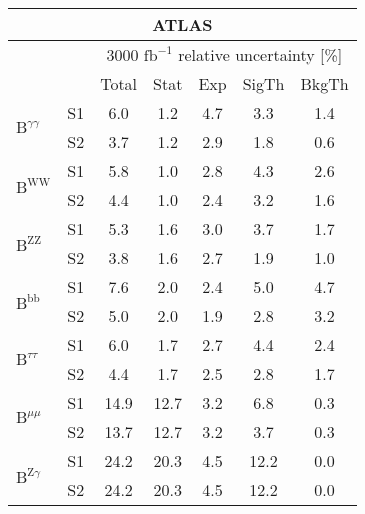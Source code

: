 \begin{tabular}{@{} l c c@{\hskip 0.15in} c c c c @{}}
  \hline
     \multicolumn{7}{c}{ATLAS}\\
 \hline
  &  & \multicolumn{5}{c}{3000 $\text{fb}^{-1}$ relative uncertainty [\%]} \\
  &  & Total & Stat & Exp & SigTh & BkgTh \\
  \hline
  \multirow{2}{*}{$\mathrm{B}^{\gamma\gamma}$} & S1 &6.0   & 1.2   & 4.7   & 3.3   & 1.4  \\[1pt] 
  & S2 &3.7   & 1.2   & 2.9   & 1.8   & 0.6  \\[4pt]
  \multirow{2}{*}{$\mathrm{B}^{\mathrm{WW}}$} & S1 &5.8   & 1.0   & 2.8   & 4.3   & 2.6  \\[1pt]
  & S2 &4.4   & 1.0   & 2.4   & 3.2   & 1.6  \\[4pt]
  \multirow{2}{*}{$\mathrm{B}^{\mathrm{ZZ}}$} & S1 &5.3   & 1.6   & 3.0   & 3.7   & 1.7  \\[1pt]
  & S2 &3.8   & 1.6   & 2.7   & 1.9   & 1.0  \\[4pt]
  \multirow{2}{*}{$\mathrm{B}^{\mathrm{bb}}$} & S1 &7.6   & 2.0   & 2.4   & 5.0   & 4.7  \\[1pt]
  & S2 &5.0   & 2.0   & 1.9   & 2.8   & 3.2  \\[4pt]
  \multirow{2}{*}{$\mathrm{B}^{\tau\tau }$} & S1 &6.0   & 1.7   & 2.7   & 4.4   & 2.4  \\[1pt]
  & S2 &4.4   & 1.7   & 2.5   & 2.8   & 1.7  \\[4pt]
  \multirow{2}{*}{$\mathrm{B}^{\mu\mu}$} & S1  &14.9  & 12.7  & 3.2   & 6.8   & 0.3  \\[1pt]
  & S2 &13.7  & 12.7  & 3.2   & 3.7   & 0.3  \\[4pt]
  \multirow{2}{*}{$\mathrm{B}^{\mathrm{Z}\gamma}$} & S1 &24.2  & 20.3  & 4.5   & 12.2  & 0.0  \\[1pt]
  & S2 &24.2  & 20.3  & 4.5   & 12.2  & 0.0  \\[4pt]
  \hline
\end{tabular}
